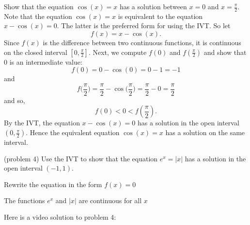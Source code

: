 \documentclass[handout]{ximera}
\begin{document}
\begin{example}[example 4]
Show that the equation $\cos(x) = x$ has a solution 
between $x = 0$ and $x = \frac{\pi}{2}$. \\
Note that the equation $\cos(x) = x$ is equivalent to the equation $x - \cos(x) =0$.
The latter is the preferred form for using the IVT.
So let 
\[f(x) = x - \cos(x).\] 
 Since $f(x)$ is the difference between two continuous functions,
it is continuous on the closed interval $[0, \frac{\pi}{2}]$. 
Next, we compute $f(0)$ and $f(\frac{\pi}{2})$ and show that 0 is an intermediate value:
\[f(0) = 0 - \cos(0) = 0-1 = -1 \]
and
\[f\big(\frac{\pi}{2}\big) = \frac{\pi}{2} - \cos\big(\frac{\pi}{2}\big) = \frac{\pi}{2}-0 = \frac{\pi}{2} \]
and so,
\[f(0) < 0 < f(\frac{\pi}{2}).\]
By the IVT, the equation $ x - \cos(x) =0$ has a solution in the open 
interval $(0, \frac{\pi}{2})$. Hence the equivalent equation $\cos(x) = x$ 
has a solution on the same interval.
\end{example}


\begin{problem}(problem 4)
Use the IVT to show that the equation $e^x = |x|$ has a solution in the open interval $(-1, 1)$.\\
\begin{hint}
Rewrite the equation in the form $f(x) = 0$
\end{hint}
\begin{hint}
The functions $e^x$ and $|x|$ are continuous for all $x$
\end{hint}
\end{problem}

Here is a video solution to problem 4:
\begin{foldable}
\end{foldable}
\end{document}
